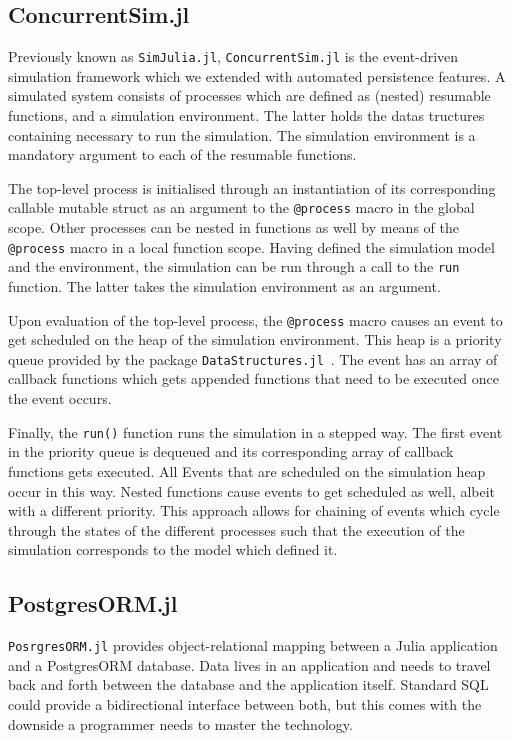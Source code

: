 \documentclass{juliacon}
\begin{document}
\subsection{ConcurrentSim.jl}

Previously known as \texttt{SimJulia.jl}, \texttt{ConcurrentSim.jl}  is the event-driven simulation framework which we extended with automated persistence features. A simulated system consists of processes which are defined as (nested) resumable functions, and a simulation environment. The latter holds the datas tructures containing necessary to run the simulation. The simulation environment is a mandatory argument to each of the resumable functions. \vskip 6pt

The top-level process is initialised through an instantiation of its corresponding callable mutable struct as an argument to the \texttt{@process} macro in the global scope. Other processes can be nested in functions as well by means of the \texttt{@process} macro in a local function scope. Having defined the simulation model and the environment, the simulation can be run through a call to the \texttt{run} function. The latter takes the simulation environment as an argument. \vskip 6pt

Upon evaluation of the top-level process, the \texttt{@process} macro causes an event to get scheduled on the heap of the simulation environment. This heap is a priority queue provided by the package \mbox{\texttt{DataStructures.jl} \cite{datastructures}}. The event has an array of callback functions which gets appended functions that need to be executed once the event occurs. \vskip 6pt

Finally, the \texttt{run()} function runs the simulation in a stepped way. The first event in the priority queue is dequeued and its corresponding array of callback functions gets executed. All Events that are scheduled on the simulation heap occur in this way. Nested functions cause events to get scheduled as well, albeit with a different priority. This approach allows for chaining of events which cycle through the states of the different processes such that the execution of the simulation corresponds to the model which defined it. \vskip 6pt

\subsection{PostgresORM.jl}

\texttt{PosrgresORM.jl} provides object-relational mapping between a \mbox{Julia} application and a PostgresORM database. Data lives in an application and needs to travel back and forth between the database and the application itself. Standard SQL could provide a bidirectional interface between both, but this comes with the downside a programmer needs to master the technology. \vskip 6pt
\end{document}

